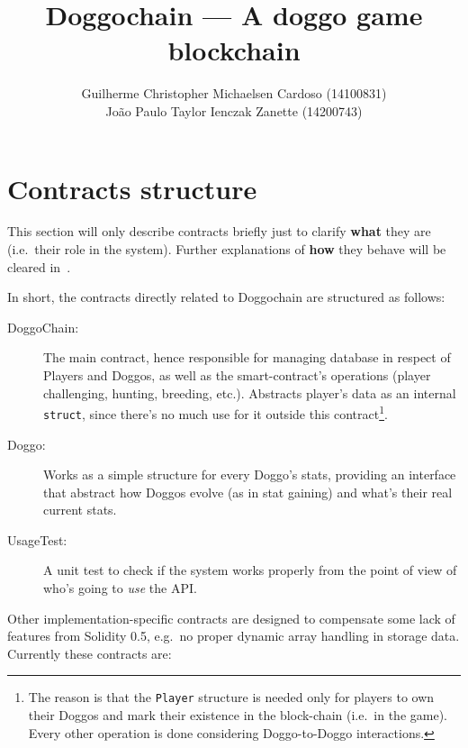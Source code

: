 \documentclass{article}
\title{%
    Doggochain --- A doggo game blockchain \\
    [0.5em]
    \smaller{2nd report}
}
\author{%
    Guilherme Christopher Michaelsen Cardoso (14100831) \\
    João Paulo Taylor Ienczak Zanette (14200743)
}
\begin{document}
    \maketitle

    \section{Contracts structure}

    This section will only describe contracts briefly just to clarify
    \textbf{what} they are (i.e.\ their role in the system). Further
    explanations of \textbf{how} they behave will be cleared
    in~.

    In short, the contracts directly related to Doggochain are structured as
    follows:

    \begin{description}
        \item[DoggoChain:] The main contract, hence responsible for managing
            database in respect of Players and Doggos, as well as the
            smart-contract's operations (player challenging, hunting, breeding,
            etc.). Abstracts player's data as an internal \texttt{struct},
            since there's no much use for it outside this contract\footnote{%
                The reason is that the \texttt{Player} structure is needed only
                for players to own their Doggos and mark their existence in the
                block-chain (i.e.\ in the game). Every other operation is done
                considering Doggo-to-Doggo interactions.
            }.
        \item[Doggo:] Works as a simple structure for every Doggo's stats,
            providing an interface that abstract how Doggos evolve (as in stat
            gaining) and what's their real current stats.
        \item[UsageTest:] A unit test to check if the system works properly
            from the point of view of who's going to \textit{use} the API\@.
    \end{description}

    Other implementation-specific contracts are designed to compensate some
    lack of features from Solidity 0.5, e.g.\ no proper dynamic array handling
    in storage data. Currently these contracts are:
\end{document}
